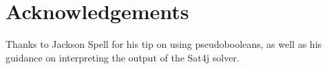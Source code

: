 
\section{Acknowledgements} 
\label{sec:ack} 

Thanks to Jackson Spell for his tip on using pseudobooleans, as well
as his guidance on interpreting the output of the Sat4j solver.
